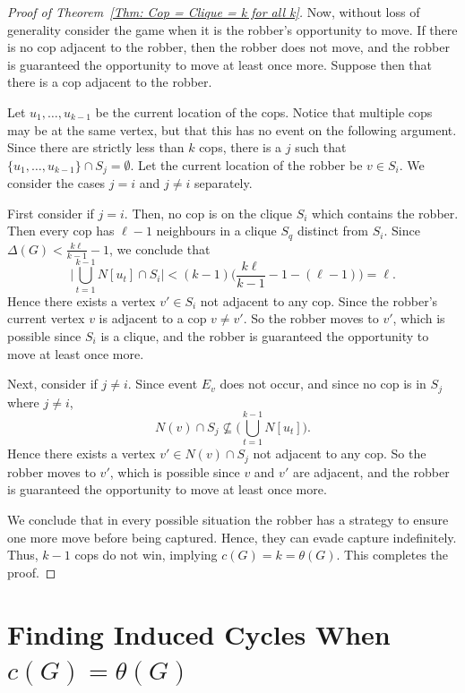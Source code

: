 \documentclass[12pt]{amsart}
\theoremstyle{definition}
\begin{document}
\begin{proof}[Proof of Theorem~\ref{Thm: Cop = Clique = k for all k}]
    Now, without loss of generality consider the game when it is the robber's opportunity to move.
    If there is no cop adjacent to the robber, then the robber does not move, and  the robber is guaranteed the opportunity to move at least once more.
    Suppose then that there is a cop adjacent to the robber.

    Let $u_1,\dots, u_{k-1}$ be the current location of the cops.
    Notice that multiple cops may be at the same vertex, but that this has no event on the following argument.
    Since there are strictly less than  $k$ cops, there is a $j$ such that $\{u_1,\dots, u_{k-1}\} \cap S_j = \emptyset$.
    Let the current location of the robber be $v \in S_i$.
    We consider the cases $j = i$ and $j\neq i$ separately.

    First consider if $j = i$.
    Then, no cop is on the clique $S_i$ which contains the robber.
    Then every cop has $\ell-1$ neighbours in a clique $S_q$ distinct from $S_i$.
    Since $\Delta(G) < \frac{k\ell}{k-1} - 1$, we conclude that
    \[
    \Big|\bigcup_{t=1}^{k-1} N[u_t] \cap S_i\Big| <  (k-1)\Big(\frac{k\ell}{k-1} - 1 - (\ell - 1) \Big) = \ell.
    \]
    Hence there exists a vertex $v' \in S_i $ not adjacent to any cop.
    Since the robber's current vertex $v$ is adjacent to a cop $v\neq v'$.
    So the robber moves to $v'$, which is possible since $S_i$ is a clique, and the robber is guaranteed the opportunity to move at least once more.

    Next, consider if $j\neq i$.
    Since event $E_v$ does not occur, and since no cop is in $S_j$ where $j\neq i$,
    \[
    N(v) \cap S_j \not\subseteq \Big(\bigcup_{t=1}^{k-1} N[u_t] \Big).
    \]
    Hence there exists a vertex $v' \in N(v) \cap S_j $ not adjacent to any cop.
    So the robber moves to $v'$, which is possible since $v$ and $v'$ are adjacent, and the robber is guaranteed the opportunity to move at least once more.

    We conclude that in every possible situation the robber has a strategy to ensure one more move before being captured.
    Hence, they can evade capture indefinitely.
    Thus, $k-1$ cops do not win, implying $c(G) = k = \theta(G)$.
    This completes the proof.
\end{proof}







\section{Finding Induced Cycles When $c(G) = \theta(G)$}
\end{document}
